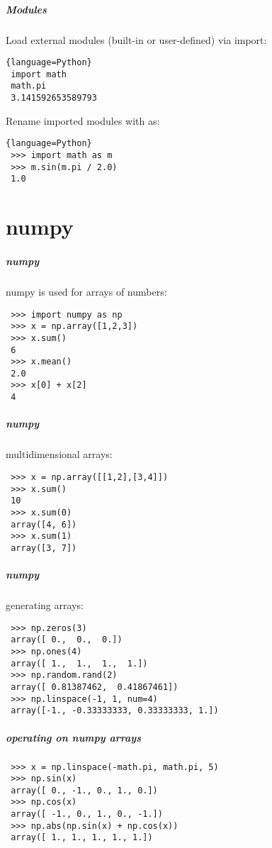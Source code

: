 \documentclass[hyperref={colorlinks, linkcolor=blue, urlcolor=blue}]{beamer}
\begin{document}
\begin{frame}[fragile]
  \frametitle{Modules}

  Load external modules (built-in or user-defined) via import:
  \begin{lstlisting}{language=Python}
 import math 
 math.pi
 3.141592653589793 
  \end{lstlisting}
  Rename imported modules with as:
  \begin{lstlisting}{language=Python}
 >>> import math as m
 >>> m.sin(m.pi / 2.0)
 1.0
  \end{lstlisting}
\end{frame}

\part{numpy} 

\begin{frame}[fragile]
  \frametitle{numpy}
  numpy is used for arrays of numbers:
  \begin{lstlisting}
 >>> import numpy as np
 >>> x = np.array([1,2,3])
 >>> x.sum()
 6
 >>> x.mean()
 2.0
 >>> x[0] + x[2]
 4
  \end{lstlisting}
\end{frame}

\begin{frame}[fragile]
  \frametitle{numpy}
  multidimensional arrays:
  \begin{lstlisting}
 >>> x = np.array([[1,2],[3,4]])
 >>> x.sum()
 10
 >>> x.sum(0)
 array([4, 6])
 >>> x.sum(1)
 array([3, 7])
  \end{lstlisting}
\end{frame}

\begin{frame}[fragile]
  \frametitle{numpy}
  generating arrays:
  \begin{lstlisting}
 >>> np.zeros(3)
 array([ 0.,  0.,  0.])
 >>> np.ones(4)
 array([ 1.,  1.,  1.,  1.])
 >>> np.random.rand(2)
 array([ 0.81387462,  0.41867461])
 >>> np.linspace(-1, 1, num=4)
 array([-1., -0.33333333, 0.33333333, 1.])
  \end{lstlisting}
\end{frame}

\begin{frame}[fragile]
  \frametitle{operating on numpy arrays}
  \begin{lstlisting}
 >>> x = np.linspace(-math.pi, math.pi, 5)
 >>> np.sin(x)
 array([ 0., -1., 0., 1., 0.])
 >>> np.cos(x)
 array([ -1., 0., 1., 0., -1.])
 >>> np.abs(np.sin(x) + np.cos(x))
 array([ 1., 1., 1., 1., 1.])
  \end{lstlisting}
\end{frame}
\end{document}
